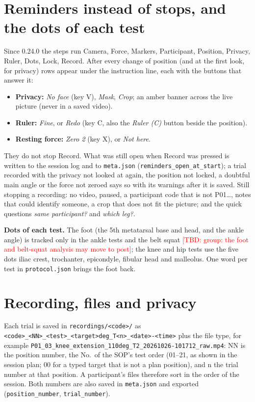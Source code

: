 \documentclass[a4paper,10pt]{article}
\newcommand{\code}[1]{\texttt{#1}}
\newcommand{\tbd}[1]{\textcolor{red}{[TBD: #1]}}
\begin{document}
\section{Reminders instead of stops, and the dots of each test}\label{sec:reminders}
Since 0.24.0 the steps run Camera, Force, Markers, Participant, Position, Privacy, Ruler, Dots, Lock, Record. After every change of
position (and at the first look, for privacy) rows appear under the instruction line, each with the buttons that answer it:
\begin{itemize}
\item \textbf{Privacy:} \emph{No face} (key V), \emph{Mask}, \emph{Crop}; an amber banner across the live picture (never in a saved video).
\item \textbf{Ruler:} \emph{Fine}, or \emph{Redo} (key C, also the \emph{Ruler (C)} button beside the position).
\item \textbf{Resting force:} \emph{Zero 2} (key X), or \emph{Not here}.
\end{itemize}
They do not stop Record. What was still open when Record was pressed is written to the session log and to \code{meta.json}
(\code{reminders\_open\_at\_start}); a trial recorded with the privacy not looked at again, the position not locked, a doubtful main angle or
the force not zeroed says so with its warnings after it is saved. Still stopping a recording: no video, paused, a participant code that is not
P01\dots, notes that could identify someone, a crop that does not fit the picture; and the quick questions \emph{same participant?} and
\emph{which leg?}.

\textbf{Dots of each test.} The foot (the 5th metatarsal base and head, and the ankle angle) is tracked only in the ankle tests and the belt
squat \tbd{group: the foot and belt-squat analysis may move to post}; the knee and hip tests use the five dots iliac crest, trochanter,
epicondyle, fibular head and malleolus. One word per test in \code{protocol.json} brings the foot back.

\section{Recording, files and privacy}
Each trial is saved in \code{recordings/<code>/} as \code{<code>\_<NN>\_<test>\_<target>deg\_T<n>\_<date>-<time>} plus the file
type, for example \code{P01\_03\_knee\_extension\_110deg\_T2\_20261026-101712\_raw.mp4}: NN is the position number, the No.\ of the SOP's test
order (01--21, as shown in the session plan; 00 for a typed target that is not a plan position), and n the trial number at that position.
A participant's files therefore sort in the order of the session. Both numbers are also saved in \code{meta.json} and exported
(\code{position\_number}, \code{trial\_number}).
\end{document}
